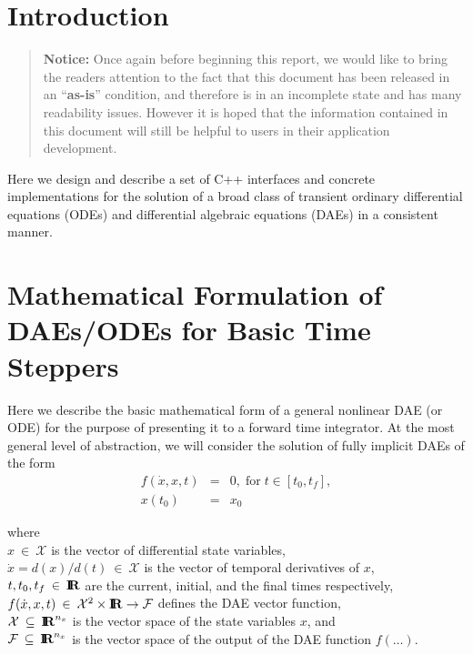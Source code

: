 \cleardoublepage{}

\section{Introduction}
\begin{quote}
\textbf{Notice:} Once again before beginning this report, we would
like to bring the readers attention to the fact that this document
has been released in an ``\textbf{as-is}'' condition, and therefore
is in an incomplete state and has many readability issues. However
it is hoped that the information contained in this document will still
be helpful to users in their application development.
\end{quote}
Here we design and describe a set of C++ interfaces and concrete implementations
for the solution of a broad class of transient ordinary differential
equations (ODEs) and differential algebraic equations (DAEs) in a
consistent manner. 

\cleardoublepage{}

\section{Mathematical Formulation of DAEs/ODEs for Basic Time Steppers\label{rythmos:sec:mathformulation}}

Here we describe the basic mathematical form of a general nonlinear
DAE (or ODE) for the purpose of presenting it to a forward time integrator.
At the most general level of abstraction, we will consider the solution
of fully implicit DAEs of the form 
\begin{eqnarray}
f(\dot{x},x,t) & = & 0,\;\mbox{for}\;t\in[t_{0},t_{f}],\label{rythmos:eq:dae}\\
x(t_{0}) & = & x_{0}\label{rythmos:eq:dae:ic}
\end{eqnarray}
\begin{tabbing} where\hspace{5ex}\= \\
 \> $x\:\in\:\mathcal{X}$ is the vector of differential state variables,
\\
 \> $\dot{x}=d(x)/d(t)\:\in\:\mathcal{X}$ is the vector of temporal
derivatives of $x$, \\
 \> $t,t_{0},t_{f}\:\in\:\mbox{\textbf{I}}\hspace{-0.6ex}\mbox{\textbf{R}}$ are the current, initial, and the
final times respectively, \\
 \> $f(\dot{x},x,t)\:\in\:\mathcal{X}^{2}\times\mbox{\textbf{I}}\hspace{-0.6ex}\mbox{\textbf{R}}\rightarrow\mathcal{F}$
defines the DAE vector function, \\
 \> $\mathcal{X}\:\subseteq\:\mbox{\textbf{I}}\hspace{-0.6ex}\mbox{\textbf{R}}^{n_{x}}$ is the vector space of
the state variables $x$, and \\
 \> $\mathcal{F}\:\subseteq\:\mbox{\textbf{I}}\hspace{-0.6ex}\mbox{\textbf{R}}^{n_{x}}$ is the vector space of
the output of the DAE function $f(\ldots)$. \end{tabbing}

